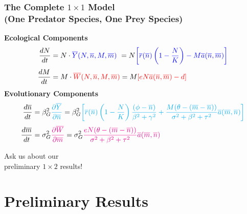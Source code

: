 \documentclass[10pt]{beamer}
\begin{document}
\begin{frame}
	\frametitle{The Complete $1\times1$ Model \\ (One Predator Species, One Prey Species)}
	{\bf Ecological Components}
	\begin{align*}
		\frac{dN}{dt} &= N\cdot {\color{blue}\overline{Y}(N, \overline{n}, M, \overline{m})}\ = N{\color{blue}\left[\overline{r}(\overline{n})\left(1 - \frac{N}{K}\right) - M\overline{a}(\overline{n}, \overline{m})\right]}\\[.1cm]
		\frac{dM}{dt} &= M\cdot {\color{red}\overline{W}(N, \overline{n}, M, \overline{m})} = M{\color{red}\left[eN\overline{a}(\overline{n}, \overline{m}) - d\right]}
	\end{align*}
	{\bf Evolutionary Components}
	\begin{align*}
		\frac{d\overline{n}}{dt} &= \beta_G^2{\color{cyan}\frac{\partial \overline{Y}}{\partial \overline{n}}} = \beta_G^2{\color{cyan}\left[\overline{r}(\overline{n})\left(1 - \frac{N}{K}\right)\frac{(\phi - \overline{n})}{\beta^2 + \gamma^2} + \frac{M(\theta - (\overline{m} - \overline{n}))}{\sigma^2 + \beta^2 + \tau^2} \overline{a}(\overline{m}, \overline{n})\right]}\\[.1cm]
		\frac{d\overline{m}}{dt} &= \sigma_G^2{\color{magenta}\frac{\partial \overline{W}}{\partial \overline{m}}} = \sigma_G^2{\color{magenta}\frac{eN(\theta - (\overline{m} - \overline{n}))}{\sigma^2 + \beta^2 + \tau^2} \overline{a}(\overline{m}, \overline{n})}
	\end{align*}
\end{frame}



\begin{frame}
	\begin{center}
		\huge Ask us about our\\ preliminary $1 \times 2$ results!
	\end{center}
\end{frame}




\section{Preliminary Results}
\end{document}
